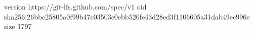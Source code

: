 version https://git-lfs.github.com/spec/v1
oid sha256:26bbc25805a0f99b47c03503c0ebb520fe43d28ed3f1106605a31dab49ec996e
size 1797
